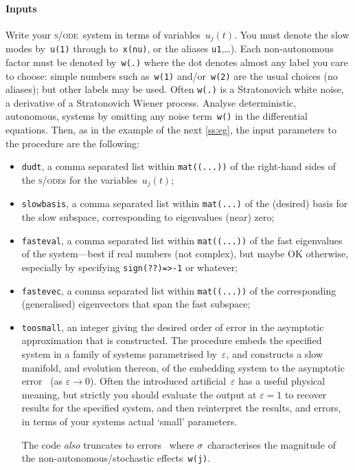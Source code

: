 \documentclass[11pt,a5paper]{article}
\def\eps{\ensuremath{\varepsilon}}
\def\sde{\textsc{s/ode}}
\begin{document}
\paragraph{Inputs}
Write your \sde\ system in terms of variables~\(u_j(t)\). 
You must denote the slow modes by~\verb|u(1)| through
to~\verb|x(nu)|, or the aliases \verb|u1|,\ldots). Each
non-autonomous factor must be denoted by~\verb|w(.)| where
the dot denotes almost any label you care to choose: simple
numbers such as~\verb|w(1)| and/or~\verb|w(2)| are the usual
choices (no aliases); but other labels may be used. Often
\verb|w(.)| is a Stratonovich white noise, a derivative of a
Stratonovich Wiener process. Analyse deterministic,
autonomous, systems by omitting any noise term~\verb|w()| in
the differential equations.  Then, as in the example of the
next \cref{ss:eg}, the input parameters to the procedure are
the following:
\begin{itemize}
\item \verb|dudt|, a comma separated list within
\verb|mat((...))| of the right-hand sides of the \sde{}s for
the variables~\(u_j(t)\);

\item \verb|slowbasis|, a comma separated list within
\verb|mat(...)| of the (desired) basis for the slow
subspace, corresponding to eigenvalues (near) zero;

\item \verb|fasteval|, a comma separated list within
\verb|mat((...))| of the fast eigenvalues of the
system---best if real numbers (not complex), but maybe OK
otherwise, especially by specifying \verb|sign(??)=>-1| or
whatever;

\item \verb|fastevec|, a comma separated list within
\verb|mat((...))| of the corresponding (generalised)
eigenvectors that span the fast subspace;

\item \verb|toosmall|, an integer giving the desired order
of error in the asymptotic approximation that is
constructed.  The procedure embeds the specified system in a
family of systems parametrised by~\(\eps\), and constructs a
slow manifold, and evolution thereon, of the embedding
system to the asymptotic error~\Ord{\eps^{\tt toosmall}} (as
\(\eps\to0\)).  Often the introduced artificial~\(\eps\) has
a useful physical meaning, but strictly you should evaluate
the output at \(\eps=1\) to recover results for the
specified system, and then reinterpret the results, and
errors, in terms of your systems actual `small' parameters.

The code \emph{also} truncates to errors~
where \(\sigma\)~characterises the magnitude of the
non-autonomous\slash stochastic effects~\verb|w(j)|.

\end{itemize}
\end{document}
